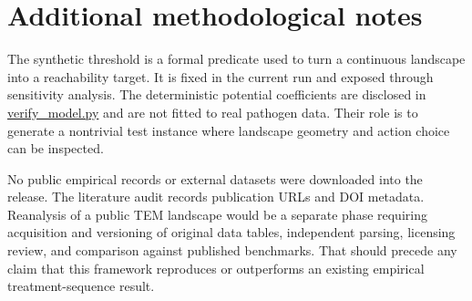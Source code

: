 \documentclass[11pt]{article}
\theoremstyle{definition}\newtheorem{definition}[proposition]{Definition}\theoremstyle{remark}\newtheorem{remark}[proposition]{Remark}
\begin{document}
\section{Additional methodological notes}
The synthetic threshold is a formal predicate used to turn a continuous landscape into a reachability target. It is fixed in the current run and exposed through sensitivity analysis. The deterministic potential coefficients are disclosed in \url{verify_model.py} and are not fitted to real pathogen data. Their role is to generate a nontrivial test instance where landscape geometry and action choice can be inspected.

No public empirical records or external datasets were downloaded into the release. The literature audit records publication URLs and DOI metadata. Reanalysis of a public TEM landscape would be a separate phase requiring acquisition and versioning of original data tables, independent parsing, licensing review, and comparison against published benchmarks. That should precede any claim that this framework reproduces or outperforms an existing empirical treatment-sequence result.

\clearpage
\end{document}
